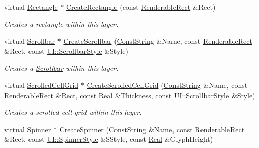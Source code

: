 \begin{DoxyCompactItemize}
virtual \hyperlink{classMezzanine_1_1UI_1_1Rectangle}{Rectangle} $\ast$ \hyperlink{classMezzanine_1_1UI_1_1Layer_a415a8cdf35364dff4948f22f42d81646}{CreateRectangle} (const \hyperlink{structMezzanine_1_1UI_1_1RenderableRect}{RenderableRect} \&Rect)
\begin{DoxyCompactList}\small\item\em Creates a rectangle within this layer. \item\end{DoxyCompactList}\item 
virtual \hyperlink{classMezzanine_1_1UI_1_1Scrollbar}{Scrollbar} $\ast$ \hyperlink{classMezzanine_1_1UI_1_1Layer_afdb47f6623a52471ec85e06148afb451}{CreateScrollbar} (\hyperlink{namespaceMezzanine_a63cd699ac54b73953f35ec9cfc05e506}{ConstString} \&Name, const \hyperlink{structMezzanine_1_1UI_1_1RenderableRect}{RenderableRect} \&Rect, const \hyperlink{namespaceMezzanine_1_1UI_a5998a9bf372a7e92605c0c461736e763}{UI::ScrollbarStyle} \&Style)
\begin{DoxyCompactList}\small\item\em Creates a \hyperlink{classMezzanine_1_1UI_1_1Scrollbar}{Scrollbar} within this layer. \item\end{DoxyCompactList}\item 
virtual \hyperlink{classMezzanine_1_1UI_1_1ScrolledCellGrid}{ScrolledCellGrid} $\ast$ \hyperlink{classMezzanine_1_1UI_1_1Layer_af6e676e7aa1d918afabe3467c42dbfe8}{CreateScrolledCellGrid} (\hyperlink{namespaceMezzanine_a63cd699ac54b73953f35ec9cfc05e506}{ConstString} \&Name, const \hyperlink{structMezzanine_1_1UI_1_1RenderableRect}{RenderableRect} \&Rect, const \hyperlink{namespaceMezzanine_a726731b1a7df72bf3583e4a97282c6f6}{Real} \&Thickness, const \hyperlink{namespaceMezzanine_1_1UI_a5998a9bf372a7e92605c0c461736e763}{UI::ScrollbarStyle} \&Style)
\begin{DoxyCompactList}\small\item\em Creates a scrolled cell grid within this layer. \item\end{DoxyCompactList}\item 
virtual \hyperlink{classMezzanine_1_1UI_1_1Spinner}{Spinner} $\ast$ \hyperlink{classMezzanine_1_1UI_1_1Layer_a78a8ee333aee9ad5ce03228e41dbe3aa}{CreateSpinner} (\hyperlink{namespaceMezzanine_a63cd699ac54b73953f35ec9cfc05e506}{ConstString} \&Name, const \hyperlink{structMezzanine_1_1UI_1_1RenderableRect}{RenderableRect} \&Rect, const \hyperlink{namespaceMezzanine_1_1UI_a62462d4df783dcdda77e1590a96bc6d6}{UI::SpinnerStyle} \&SStyle, const \hyperlink{namespaceMezzanine_a726731b1a7df72bf3583e4a97282c6f6}{Real} \&GlyphHeight)

\end{DoxyCompactItemize}
